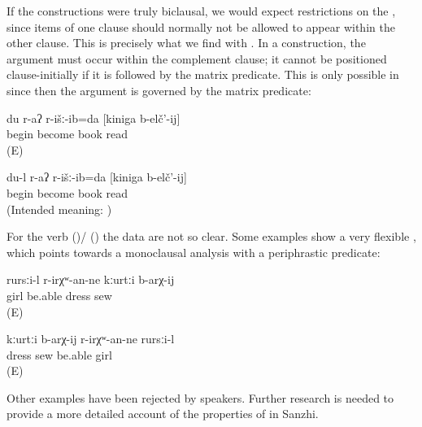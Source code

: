 If the constructions were truly biclausal, we would expect restrictions on the , since items of one clause should normally not be allowed to appear within the other clause. This is precisely what we find with . In a  construction, the  argument must occur within the complement clause; it cannot be positioned clause-initially if it is followed by the matrix predicate. This is only possible in  since then the argument is governed by the matrix predicate:
%
\begin{exe}
	\ex	\label{ex:‎I began to read the book}
	\gll	du	r-aʔ	r-išː-ib=da	[kiniga	b-elč'-ij]\\
			\tsc{f-}begin	become	book	read\\
	\glt	{} (E)

	\ex	\label{ex:I began to read the book ungrammatical}
	\gll	{*} 	du-l	r-aʔ	r-išː-ib=da	[kiniga	b-elč'-ij]\\
		{}		\tsc{f-}begin	become	book	read\\
	\glt	‎ (Intended meaning: )
\end{exe}

For the verb   ()\slash{} ()  the data are not so clear. Some examples show a very flexible , which points towards a monoclausal analysis with a periphrastic predicate:
%
\begin{exe}
	\ex
	\gll	rursːi-l	r-irχʷ-an-ne kːurtːi	b-arχ-ij \\
		girl	be.able	dress	sew\\
	\glt	{} (E)

	\ex
	\gll	kːurtːi	b-arχ-ij	r-irχʷ-an-ne	rursːi-l\\
		dress	sew	be.able	girl\\
	\glt	{} (E)
\end{exe}

Other examples have been rejected by speakers. Further research is needed to provide a more detailed account of the properties of  in Sanzhi.



